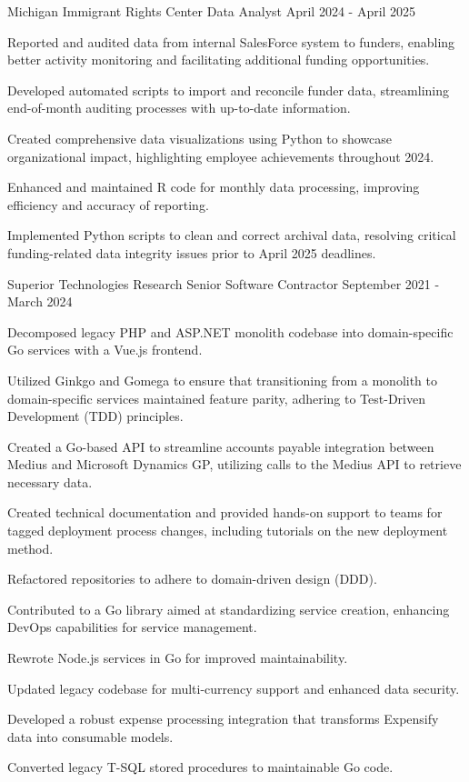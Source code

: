 \documentclass{../styles/cv}
\begin{document}
\subsectionpositiondate
    {Michigan Immigrant Rights Center}
    {Data Analyst}
    {April 2024 - April 2025}
\resumesublistbegin
    \item Reported and audited data from internal SalesForce system to funders, enabling better activity monitoring and facilitating additional funding opportunities.
    \item Developed automated scripts to import and reconcile funder data, streamlining end-of-month auditing processes with up-to-date information.
    \item Created comprehensive data visualizations using Python to showcase organizational impact, highlighting employee achievements throughout 2024.
    \item Enhanced and maintained R code for monthly data processing, improving efficiency and accuracy of reporting.
    \item Implemented Python scripts to clean and correct archival data, resolving critical funding-related data integrity issues prior to April 2025 deadlines.
\resumesublistend

\subsectionpositiondate
    {Superior Technologies Research}
    {Senior Software Contractor}
    {September 2021 - March 2024}
\resumesublistbegin
    \item Decomposed legacy PHP and ASP.NET monolith codebase into domain-specific Go services with a Vue.js frontend.
    \item Utilized Ginkgo and Gomega to ensure that transitioning from a monolith to domain-specific services maintained feature parity, adhering to Test-Driven Development (TDD) principles.
    \item Created a Go-based API to streamline accounts payable integration between Medius and Microsoft Dynamics GP, utilizing calls to the Medius API to retrieve necessary data.
    \item Created technical documentation and provided hands-on support to teams for tagged deployment process changes, including tutorials on the new deployment method.
    \item Refactored repositories to adhere to domain-driven design (DDD).
    \item Contributed to a Go library aimed at standardizing service creation, enhancing DevOps capabilities for service management.
    \item Rewrote Node.js services in Go for improved maintainability.
    \item Updated legacy codebase for multi-currency support and enhanced data security.
    \item Developed a robust expense processing integration that transforms Expensify data into consumable models.
    \item Converted legacy T-SQL stored procedures to maintainable Go code.
\resumesublistend
\end{document}
